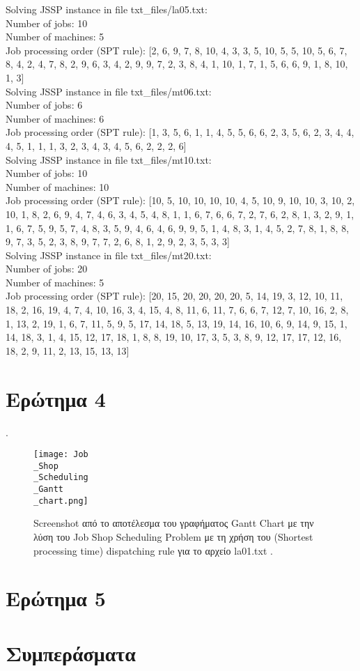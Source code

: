 \documentclass[paper=a4, fontsize=11pt]{scrartcl}
\numberwithin{equation}{section}		%
\numberwithin{figure}{section}			%
\numberwithin{table}{section}				%
\begin{document}
Solving JSSP instance in file txt\_files/la05.txt: \\
Number of jobs: 10 \\
Number of machines: 5 \\
Job processing order (SPT rule): [2, 6, 9, 7, 8, 10, 4, 3, 3, 5, 10, 5, 5, 10, 5, 6, 7, 8, 4, 2, 4, 7, 8, 2, 9, 6, 3, 4, 2, 9, 9, 7, 2, 3, 8, 4, 1, 10, 1, 7, 1, 5, 6, 6, 9, 1, 8, 10, 1, 3] \\


Solving JSSP instance in file txt\_files/mt06.txt: \\
Number of jobs: 6 \\ 
Number of machines: 6 \\
Job processing order (SPT rule): [1, 3, 5, 6, 1, 1, 4, 5, 5, 6, 6, 2, 3, 5, 6, 2, 3, 4, 4, 4, 5, 1, 1, 1, 3, 2, 3, 4, 3, 4, 5, 6, 2, 2, 2, 6] \\


Solving JSSP instance in file txt\_files/mt10.txt: \\
Number of jobs: 10 \\ 
Number of machines: 10 \\
Job processing order (SPT rule): [10, 5, 10, 10, 10, 10, 4, 5, 10, 9, 10, 10, 3, 10, 2, 10, 1, 8, 2, 6, 9, 4, 7, 4, 6, 3, 4, 5, 4, 8, 1, 1, 6, 7, 6, 6, 7, 2, 7, 6, 2, 8, 1, 3, 2, 9, 1, 1, 6, 7, 5, 9, 5, 7, 4, 8, 3, 5, 9, 4, 6, 4, 6, 9, 9, 5, 1, 4, 8, 3, 1, 4, 5, 2, 7, 8, 1, 8, 8, 9, 7, 3, 5, 2, 3, 8, 9, 7, 7, 2, 6, 8, 1, 2, 9, 2, 3, 5, 3, 3] \\


Solving JSSP instance in file txt\_files/mt20.txt: \\
Number of jobs: 20 \\
Number of machines: 5 \\
Job processing order (SPT rule): [20, 15, 20, 20, 20, 20, 5, 14, 19, 3, 12, 10, 11, 18, 2, 16, 19, 4, 7, 4, 10, 16, 3, 4, 15, 4, 8, 11, 6, 11, 7, 6, 6, 7, 12, 7, 10, 16, 2, 8, 1, 13, 2, 19, 1, 6, 7, 11, 5, 9, 5, 17, 14, 18, 5, 13, 19, 14, 16, 10, 6, 9, 14, 9, 15, 1, 14, 18, 3, 1, 4, 15, 12, 17, 18, 1, 8, 8, 19, 10, 17, 3, 5, 3, 8, 9, 12, 17, 17, 12, 16, 18, 2, 9, 11, 2, 13, 15, 13, 13]



\section*{Ερώτημα 4} 
.\\
\begin{figure}[htbp]
\centerline{\texttt{[image: Job\\\_Shop\\\_Scheduling\\\_Gantt\\\_chart.png]}}
\caption{Screenshot από το αποτέλεσμα του γραφήματος Gantt Chart με την λύση του Job Shop Scheduling Problem με τη χρήση του (Shortest processing time) dispatching rule για το αρχείο la01.txt .}
\label{fig}
\end{figure}


\section{Ερώτημα 5}


\section{Συμπεράσματα}


\end{document}
